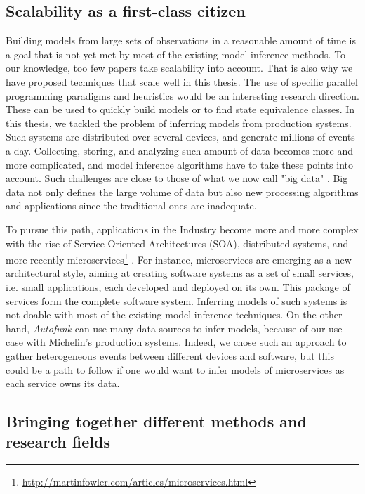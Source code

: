 \subsection{Scalability as a first-class citizen}

Building models from large sets of observations in a reasonable
amount of time is a goal that is not yet met by most of the
existing model inference methods. To our knowledge, too few
papers \cite{Yang:2006:PMT:1134285.1134325,Pradel:2009} take
scalability into account. That is also why we have proposed
techniques that scale well in this thesis. The use of specific
parallel programming paradigms and heuristics would be an
interesting research direction. These can be used to quickly
build models or to find state equivalence classes. In this
thesis, we tackled the problem of inferring models from
production systems. Such systems are distributed over several
devices, and generate millions of events a day. Collecting,
storing, and analyzing such amount of data becomes more and more
complicated, and model inference algorithms have to take these
points into account. Such challenges are close to those of what
we now call "big data" \cite{bigdata14}. Big data not only
defines the large volume of data but also new processing
algorithms and applications since the traditional ones are
inadequate.

To pursue this path, applications in the Industry become more and
more complex with the rise of Service-Oriented Architectures
(SOA), distributed systems, and more recently
microservices\footnote{\url{http://martinfowler.com/articles/microservices.html}}
\cite{thones2015microservices}.  For instance, microservices are
emerging as a new architectural style, aiming at creating
software systems as a set of small services, i.e. small
applications, each developed and deployed on its own. This
package of services form the complete software system. Inferring
models of such systems is not doable with most of the existing
model inference techniques. On the other hand, \textit{Autofunk}
can use many data sources to infer models, because of our use
case with Michelin's production systems. Indeed, we chose such an
approach to gather heterogeneous events between different devices
and software, but this could be a path to follow if one would
want to infer models of microservices as each service owns its
data.

\subsection{Bringing together different methods and research
fields}


